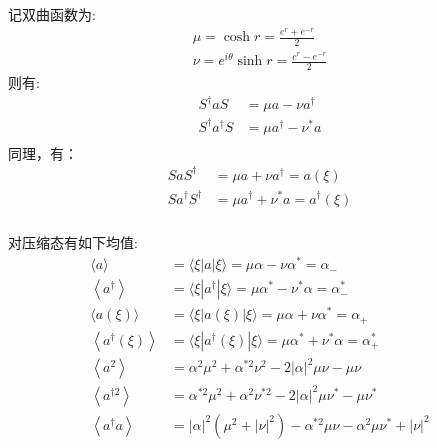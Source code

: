    \begin{frame}
    \frametitle{}
    记双曲函数为: \[ \begin{gathered}
        \mu=\cosh r=\frac{e^{r}+e^{-r}}{2} \\
        \nu=e^{i \theta} \sinh r=\frac{e^{r}-e^{-r}}{2}
        \end{gathered} \]
    则有:
    \[\begin{aligned}
        S^\dagger a S &= \mu a - \nu a^{\dagger}  \\ 
        S^{\dagger} a^{\dagger} S &=\mu a^{\dagger}-\nu^{*} a \\
        \end{aligned} \]   
    同理，有：
        \[\begin{aligned}
            S a S^{\dagger} &=\mu a+\nu a^{\dagger}  = a(\xi) \\
            S a^{\dagger} S^{\dagger} &=\mu a^{\dagger}+\nu^{*} a   = a^{\dagger} (\xi) 
            \end{aligned} \]   
   \end{frame}

   \begin{frame}
    \frametitle{}
    对压缩态有如下均值: 
       \[ \begin{aligned}
           \langle a\rangle &= \langle\xi |a| \xi\rangle = \mu\alpha - \nu \alpha^{*}  = \alpha_{-}\\
           \left\langle a^{\dagger}\right\rangle &= \langle\xi |a^{\dagger}| \xi\rangle = \mu \alpha^{*}-\nu^{*} \alpha = \alpha_{-} ^*\\
           \langle a(\xi)\rangle &= \langle\xi |a(\xi)| \xi\rangle = \mu\alpha + \nu \alpha^{*}  = \alpha_{+}\\
           \left\langle a^{\dagger}(\xi)\right\rangle &= \langle\xi |a^{\dagger}(\xi)| \xi\rangle = \mu \alpha^{*}+\nu^{*} \alpha = \alpha_{+} ^*\\
           \left\langle a^{2}\right\rangle &=\alpha^{2} \mu^{2}+\alpha^{* 2} \nu^{2}-2|\alpha|^{2} \mu \nu-\mu \nu \\
           \left\langle a^{\dagger 2} \right\rangle &=  \alpha^{* 2} \mu^{2}+ \alpha^{2}\nu^{* 2}-2|\alpha|^{2} \mu \nu^*-\mu \nu^* \\ 
           \left\langle a^{\dagger} a\right\rangle &=|\alpha|^{2}\left(\mu^{2}+|\nu|^{2}\right)-\alpha^{* 2} \mu \nu-\alpha^{2} \mu \nu^{*}+|\nu|^{2}
           \end{aligned}\]
   \end{frame}

